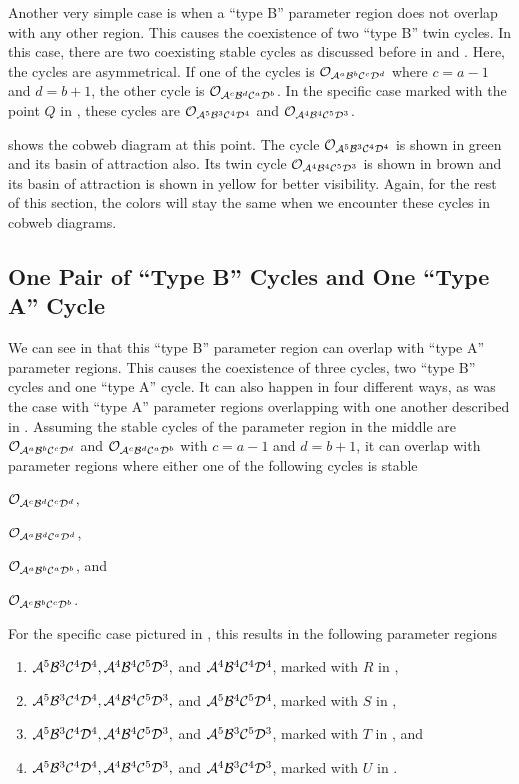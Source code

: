 Another very simple case is when a ``type B'' parameter region does not overlap with any other region.
This causes the coexistence of two ``type B'' twin cycles.
In this case, there are two coexisting stable cycles as discussed before in  and .
Here, the cycles are asymmetrical.
If one of the cycles is $\mathcal{O}_{\mathcal{A}^a\mathcal{B}^b\mathcal{C}^c\mathcal{D}^d}$ where $c = a - 1$ and $d = b + 1$, the other cycle is $\mathcal{O}_{\mathcal{A}^c\mathcal{B}^d\mathcal{C}^a\mathcal{D}^b}$.
In the specific case marked with the point $Q$ in , these cycles are $\mathcal{O}_{\mathcal{A}^5\mathcal{B}^3\mathcal{C}^4\mathcal{D}^4}$ and $\mathcal{O}_{\mathcal{A}^4\mathcal{B}^4\mathcal{C}^5\mathcal{D}^3}$.

 shows the cobweb diagram at this point.
The cycle $\mathcal{O}_{\mathcal{A}^5\mathcal{B}^3\mathcal{C}^4\mathcal{D}^4}$ is shown in green and its basin of attraction also.
Its twin cycle $\mathcal{O}_{\mathcal{A}^4\mathcal{B}^4\mathcal{C}^5\mathcal{D}^3}$ is shown in brown and its basin of attraction is shown in yellow for better visibility.
Again, for the rest of this section, the colors will stay the same when we encounter these cycles in cobweb diagrams.

\subsection{One Pair of ``Type B'' Cycles and One ``Type A'' Cycle}
\label{sec:arch.coex.AB}

We can see in  that this ``type B'' parameter region can overlap with ``type A'' parameter regions.
This causes the coexistence of three cycles, two ``type B'' cycles and one ``type A'' cycle.
It can also happen in four different ways, as was the case with ``type A'' parameter regions overlapping with one another described in .
Assuming the stable cycles of the parameter region in the middle are $\mathcal{O}_{\mathcal{A}^a\mathcal{B}^b\mathcal{C}^c\mathcal{D}^d}$ and $\mathcal{O}_{\mathcal{A}^c\mathcal{B}^d\mathcal{C}^a\mathcal{D}^b}$ with $c = a - 1$ and $d = b + 1$, it can overlap with parameter regions where either one of the following cycles is stable
\begin{enumerate*}
	\item $\mathcal{O}_{\mathcal{A}^c\mathcal{B}^d\mathcal{C}^c\mathcal{D}^d}$,
	\item $\mathcal{O}_{\mathcal{A}^a\mathcal{B}^d\mathcal{C}^a\mathcal{D}^d}$,
	\item $\mathcal{O}_{\mathcal{A}^a\mathcal{B}^b\mathcal{C}^a\mathcal{D}^b}$, and
	\item $\mathcal{O}_{\mathcal{A}^c\mathcal{B}^b\mathcal{C}^c\mathcal{D}^b}$.
\end{enumerate*}
For the specific case pictured in , this results in the following parameter regions
\begin{enumerate}
	\item $\mathcal{A}^5\mathcal{B}^3\mathcal{C}^4\mathcal{D}^4, \mathcal{A}^4\mathcal{B}^4\mathcal{C}^5\mathcal{D}^3,$ and $\mathcal{A}^4\mathcal{B}^4\mathcal{C}^4\mathcal{D}^4$, marked with $R$ in ,
	\item $\mathcal{A}^5\mathcal{B}^3\mathcal{C}^4\mathcal{D}^4, \mathcal{A}^4\mathcal{B}^4\mathcal{C}^5\mathcal{D}^3,$ and $\mathcal{A}^5\mathcal{B}^4\mathcal{C}^5\mathcal{D}^4$, marked with $S$ in ,
	\item $\mathcal{A}^5\mathcal{B}^3\mathcal{C}^4\mathcal{D}^4, \mathcal{A}^4\mathcal{B}^4\mathcal{C}^5\mathcal{D}^3,$ and $\mathcal{A}^5\mathcal{B}^3\mathcal{C}^5\mathcal{D}^3$, marked with $T$ in , and
	\item $\mathcal{A}^5\mathcal{B}^3\mathcal{C}^4\mathcal{D}^4, \mathcal{A}^4\mathcal{B}^4\mathcal{C}^5\mathcal{D}^3,$ and $\mathcal{A}^4\mathcal{B}^3\mathcal{C}^4\mathcal{D}^3$, marked with $U$ in .
\end{enumerate}

